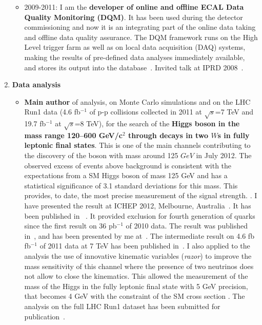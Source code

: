 \documentclass[11pt,twoside,a4paper]{article}
\begin{document}
\begin{enumerate}
\begin{itemize}
  \item 2009-2011: I am the {\bf developer of online and offline ECAL
    Data Quality Monitoring (DQM)}. It has been used during the
    detector commissioning and now it is an integrating part of the
    online data taking and offline data quality assurance.  The DQM
    framework runs on the High Level trigger farm as well as on local
    data acquisition (DAQ) systems, making the results of pre-defined
    data analyses immediately available, and stores its output into
    the database~\cite{cms_craft}. Invited talk at IPRD
    2008~\cite{proc_siena}.
  \end{itemize}

\item {\bf Data analysis}
  \begin {itemize}
    
  \item {\bf Main author} of analysis, on Monte Carlo simulations and
    on the LHC Run1 data (4.6 fb$^{-1}$ of p-p collisions collected in
    2011 at $\sqrt{s}$=7 TeV and 19.7 fb$^{-1}$ at $\sqrt{s}$=8 TeV),
    for the search of the {\bf Higgs boson in the mass range 120--600
      GeV/c$^2$ through decays in two $W$s in fully leptonic final
      states}.  This is one of the main channels contributing to the
    discovery of the boson with mass around 125 $GeV$ in July
    2012. The observed excess of events above background is consistent
    with the expectations from a SM Higgs boson of mass 125 GeV and
    has a statistical significance of 3.1 standard deviations for this
    mass. This provides, to date, the most precise measurement of the
    signal strength. \cite{pas_HWW5,AN_2013_378}.  I have presented
    the result at ICHEP 2012, Melbourne,
    Australia~\cite{conf_ichep12,proc_ichep12}. It has been published in
    ~\cite{higgsdiscovery}.  It provided exclusion for fourth
    generation of quarks since the first result on 36 pb$^{-1}$ of
    2010 data. The result was published in~\cite{cms_hww_paper2010},
    and has been presented by me at~\cite{conf_hh}.  The intermediate
    result on 4.6 fb fb$^{-1}$ of 2011 data at 7 TeV has been
    published in~\cite{Chatrchyan:2012ty,Chatrchyan:2012tx}.  I also
    applied to the analysis the use of innovative kinematic variables
    ({\it razor}) to improve the mass sensitivity of this channel
    where the presence of two neutrinos does not allow to close the
    kinematics.  This allowed the measurement of the mass of the Higgs
    in the fully leptonic final state with 5 GeV precision, that
    becomes 4 GeV with the constraint of the SM cross section
    \cite{AN_2013_002,AN_2012_071}. The analysis on the full LHC Run1
    dataset has been submitted for
    publication~\cite{Chatrchyan:2013iaa}.
    

\end{itemize}
\end{enumerate}
\end{document}
